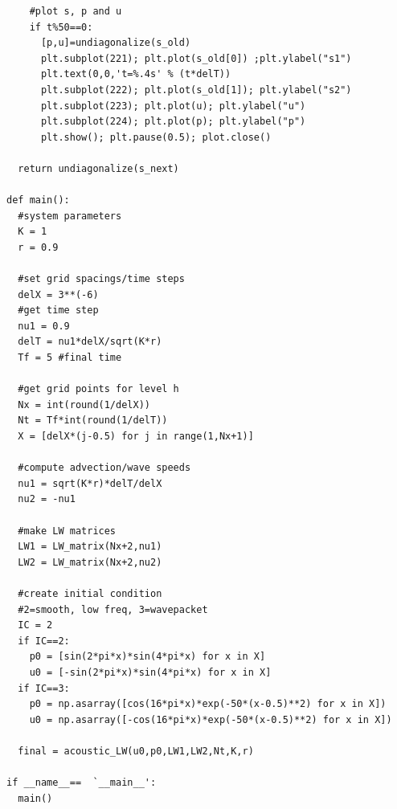 \documentclass[12pt]{article}
\begin{document}
\begin{verbatim}
    #plot s, p and u
    if t%50==0:
      [p,u]=undiagonalize(s_old)
      plt.subplot(221); plt.plot(s_old[0]) ;plt.ylabel("s1")
      plt.text(0,0,'t=%.4s' % (t*delT))
      plt.subplot(222); plt.plot(s_old[1]); plt.ylabel("s2")      
      plt.subplot(223); plt.plot(u); plt.ylabel("u")      
      plt.subplot(224); plt.plot(p); plt.ylabel("p")    
      plt.show(); plt.pause(0.5); plot.close()

  return undiagonalize(s_next)

def main():
  #system parameters
  K = 1
  r = 0.9

  #set grid spacings/time steps
  delX = 3**(-6)
  #get time step
  nu1 = 0.9
  delT = nu1*delX/sqrt(K*r)
  Tf = 5 #final time

  #get grid points for level h
  Nx = int(round(1/delX))
  Nt = Tf*int(round(1/delT))
  X = [delX*(j-0.5) for j in range(1,Nx+1)]

  #compute advection/wave speeds
  nu1 = sqrt(K*r)*delT/delX
  nu2 = -nu1

  #make LW matrices
  LW1 = LW_matrix(Nx+2,nu1)
  LW2 = LW_matrix(Nx+2,nu2)

  #create initial condition
  #2=smooth, low freq, 3=wavepacket
  IC = 2
  if IC==2:
    p0 = [sin(2*pi*x)*sin(4*pi*x) for x in X]
    u0 = [-sin(2*pi*x)*sin(4*pi*x) for x in X]
  if IC==3:
    p0 = np.asarray([cos(16*pi*x)*exp(-50*(x-0.5)**2) for x in X])  
    u0 = np.asarray([-cos(16*pi*x)*exp(-50*(x-0.5)**2) for x in X])

  final = acoustic_LW(u0,p0,LW1,LW2,Nt,K,r)

if __name__==  `__main__':
  main()

\end{verbatim}
\end{document}
